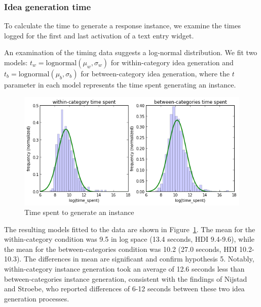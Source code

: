 \subsubsection{Idea generation time}

To calculate the time to generate a response instance, we examine the times logged for the first and last activation of a text entry widget.

An examination of the timing data suggests a log-normal distribution. We fit two models: $t_w = \text{lognormal}(\mu_w, \sigma_w)$ for within-category idea generation and $t_b = \text{lognormal}(\mu_b, \sigma_b)$ for between-category idea generation, where the $t$ parameter in each model represents the time spent generating an instance.

\begin{figure}[h]
    \centering
    \includegraphics[width=0.9\columnwidth]{hyp5_comparison}
    \caption{Time spent to generate an instance}
    \label{fig:hyp5_comparison}
\end{figure}

The resulting models fitted to the data are shown in Figure~\ref{fig:hyp5_comparison}. The mean for the within-category condition was 9.5 in log space (13.4 seconds, HDI 9.4-9.6), while the mean for the between-categories condition was 10.2 (27.0 seconds, HDI 10.2-10.3). The differences in mean are significant and confirm hypothesis 5. Notably, within-category instance generation took an average of 12.6 seconds less than between-categories instance generation, consistent with the findings of Nijstad and Stroebe, who reported differences of 6-12 seconds between these two idea generation processes.


